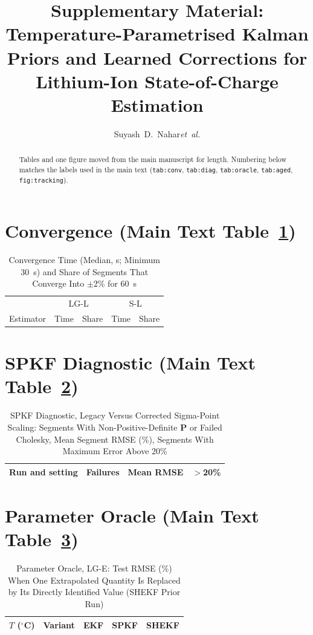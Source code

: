 \documentclass[journal]{IEEEtran}
\begin{document}
\title{Supplementary Material: Temperature-Parametrised Kalman Priors and Learned Corrections for Lithium-Ion State-of-Charge Estimation}
\author{Suyash~D.~Nahar\emph{et~al.}}
\maketitle
\begin{abstract}
Tables and one figure moved from the main manuscript for length. Numbering below matches the labels used in the main text (\texttt{tab:conv}, \texttt{tab:diag}, \texttt{tab:oracle}, \texttt{tab:aged}, \texttt{fig:tracking}).
\end{abstract}

\section{Convergence (Main Text Table~\ref*{tab:conv})}
\begin{table}[!t]
\caption{Convergence Time (Median, s; Minimum 30~s) and Share of Segments That Converge Into $\pm2$\% for 60~s}
\label{tab:conv}
\centering\scriptsize
\begin{tabular}{@{}lcccc@{}}
\toprule
 & \multicolumn{2}{c}{LG-L} & \multicolumn{2}{c}{S-L}\\
Estimator & Time & Share & Time & Share\\
\midrule

\end{tabular}
\end{table}

\section{SPKF Diagnostic (Main Text Table~\ref*{tab:diag})}
\begin{table}[!t]
\caption{SPKF Diagnostic, Legacy Versus Corrected Sigma-Point Scaling: Segments With Non-Positive-Definite $\mathbf{P}$ or Failed Cholesky, Mean Segment RMSE (\%), Segments With Maximum Error Above 20\%}
\label{tab:diag}
\centering\scriptsize
\begin{tabular}{@{}lccc@{}}
\toprule
Run and setting & Failures & Mean RMSE & $>$20\%\\
\midrule

\end{tabular}
\end{table}

\section{Parameter Oracle (Main Text Table~\ref*{tab:oracle})}
\begin{table}[!t]
\caption{Parameter Oracle, LG-E: Test RMSE (\%) When One Extrapolated Quantity Is Replaced by Its Directly Identified Value (SHEKF Prior Run)}
\label{tab:oracle}
\centering\scriptsize
\begin{tabular}{@{}rlccc@{}}
\toprule
$T$ ($^\circ$C) & Variant & EKF & SPKF & SHEKF\\
\midrule

\end{tabular}
\end{table}
\end{document}
